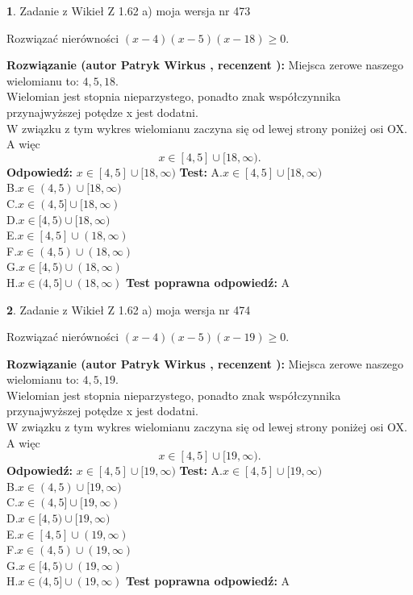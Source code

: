 \documentclass[12pt, a4paper]{article}
\theoremstyle{definition} %
\newtheorem{zad}{}
\newcommand{\zadStart}[1]{\begin{zad}#1\newline}
\newcommand{\zadStop}{\end{zad}}
\newcommand{\rozwStart}[2]{\noindent \textbf{Rozwiązanie (autor #1 , recenzent #2): }\newline}
\newcommand{\rozwStop}{\newline}
\newcommand{\odpStart}{\noindent \textbf{Odpowiedź:}\newline}
\newcommand{\odpStop}{\newline}
\newcommand{\testStart}{\noindent \textbf{Test:}\newline}
\newcommand{\testStop}{\newline}
\newcommand{\kluczStart}{\noindent \textbf{Test poprawna odpowiedź:}\newline}
\newcommand{\kluczStop}{\newline}
\begin{document}
\zadStart{Zadanie z Wikieł Z 1.62 a) moja wersja nr 473}

Rozwiązać nierówności $(x-4)(x-5)(x-18)\ge0$.
\zadStop
\rozwStart{Patryk Wirkus}{}
Miejsca zerowe naszego wielomianu to: $4, 5, 18$.\\
Wielomian jest stopnia nieparzystego, ponadto znak współczynnika przy\linebreak najwyższej potędze x jest dodatni.\\ W związku z tym wykres wielomianu zaczyna się od lewej strony poniżej osi OX. A więc $$x \in [4,5] \cup [18,\infty).$$
\rozwStop
\odpStart
$x \in [4,5] \cup [18,\infty)$
\odpStop
\testStart
A.$x \in [4,5] \cup [18,\infty)$\\
B.$x \in (4,5) \cup [18,\infty)$\\
C.$x \in (4,5] \cup [18,\infty)$\\
D.$x \in [4,5) \cup [18,\infty)$\\
E.$x \in [4,5] \cup (18,\infty)$\\
F.$x \in (4,5) \cup (18,\infty)$\\
G.$x \in [4,5) \cup (18,\infty)$\\
H.$x \in (4,5] \cup (18,\infty)$
\testStop
\kluczStart
A
\kluczStop



\zadStart{Zadanie z Wikieł Z 1.62 a) moja wersja nr 474}

Rozwiązać nierówności $(x-4)(x-5)(x-19)\ge0$.
\zadStop
\rozwStart{Patryk Wirkus}{}
Miejsca zerowe naszego wielomianu to: $4, 5, 19$.\\
Wielomian jest stopnia nieparzystego, ponadto znak współczynnika przy\linebreak najwyższej potędze x jest dodatni.\\ W związku z tym wykres wielomianu zaczyna się od lewej strony poniżej osi OX. A więc $$x \in [4,5] \cup [19,\infty).$$
\rozwStop
\odpStart
$x \in [4,5] \cup [19,\infty)$
\odpStop
\testStart
A.$x \in [4,5] \cup [19,\infty)$\\
B.$x \in (4,5) \cup [19,\infty)$\\
C.$x \in (4,5] \cup [19,\infty)$\\
D.$x \in [4,5) \cup [19,\infty)$\\
E.$x \in [4,5] \cup (19,\infty)$\\
F.$x \in (4,5) \cup (19,\infty)$\\
G.$x \in [4,5) \cup (19,\infty)$\\
H.$x \in (4,5] \cup (19,\infty)$
\testStop
\kluczStart
A
\kluczStop
\end{document}
